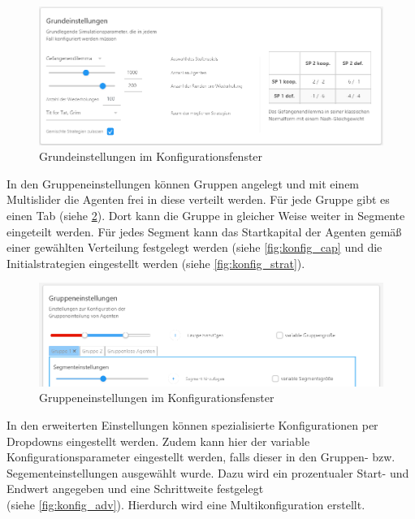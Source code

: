 \documentclass[parskip=full,11pt]{scrartcl}
\begin{document}
\begin{figure}[ht]
	\centering
	\includegraphics[width=\textwidth]{images/konfig_main.png}
	\caption{\label{fig:konfig_main}
		Grundeinstellungen im Konfigurationsfenster}
\end{figure}
\newpage
In den Gruppeneinstellungen können Gruppen angelegt und mit einem Multislider die Agenten frei in diese verteilt werden. Für jede Gruppe gibt es einen Tab (siehe \cref{fig:konfig_group}). Dort kann die Gruppe in gleicher Weise weiter in Segmente eingeteilt werden. Für jedes Segment kann das Startkapital der Agenten gemäß einer gewählten Verteilung festgelegt werden (siehe \cref{fig:konfig_cap} und die Initialstrategien eingestellt werden (siehe \cref{fig:konfig_strat}).



\begin{figure}[ht]
	\centering
	\includegraphics[width=\textwidth]{images/konfig_group.png}
	\caption{\label{fig:konfig_group}
		Gruppeneinstellungen im Konfigurationsfenster}
\end{figure}


In den erweiterten Einstellungen können spezialisierte Konfigurationen per Dropdowns eingestellt werden. Zudem kann hier der variable Konfigurationsparameter eingestellt werden, falls dieser in den Gruppen- bzw. Segementeinstellungen ausgewählt wurde. Dazu wird ein prozentualer Start- und Endwert angegeben und eine Schrittweite festgelegt \\(siehe \cref{fig:konfig_adv}). Hierdurch wird eine Multikonfiguration erstellt.
\end{document}
